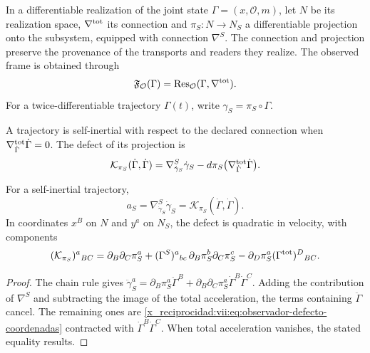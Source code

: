 In a differentiable realization of the joint state
\(\Gamma=(x,\mathcal O,m)\), let \(N\) be its realization space,
\(\nabla^{\rm tot}\) its connection and \(\pi_S:N\to N_S\) a
differentiable projection onto the subsystem, equipped with connection
\(\nabla^S\). The connection and projection preserve the provenance
of the transports and readers they realize. The observed frame is
obtained through
\[
 \mathfrak F_{\mathcal O}(\Gamma)
 =\operatorname{Res}_{\mathcal O}(\Gamma,\nabla^{\rm tot}).
\]
For a twice-differentiable trajectory \(\Gamma(t)\),
write \(\gamma_S=\pi_S\circ\Gamma\).

\begin{definition}
\label{x_reciprocidad:vii:def:observador-autoinercia}
A trajectory is self-inertial with respect to the declared connection
when \(\nabla^{\rm tot}_{\dot\Gamma}\dot\Gamma=0\).
The defect of its projection is
\begin{equation}
 \mathcal K_{\pi_S}(\dot\Gamma,\dot\Gamma)
 =\nabla^S_{\dot\gamma_S}\dot\gamma_S
  -d\pi_S\bigl(\nabla^{\rm tot}_{\dot\Gamma}\dot\Gamma\bigr).
 \label{x_reciprocidad:vii:eq:observador-defecto-proyeccion}
\end{equation}
\end{definition}

\begin{proposition}
\label{x_reciprocidad:vii:prop:observador-aceleracion}
For a self-inertial trajectory,
\[
 a_S=\nabla^S_{\dot\gamma_S}\dot\gamma_S
     =\mathcal K_{\pi_S}(\dot\Gamma,\dot\Gamma).
\]
In coordinates \(x^B\) on \(N\) and \(y^a\) on \(N_S\), the
defect is quadratic in velocity, with components
\begin{equation}
 (\mathcal K_{\pi_S})^a{}_{BC}
 =\partial_B\partial_C\pi_S^a
  +(\Gamma^S)^a{}_{bc}\,
        \partial_B\pi_S^b\partial_C\pi_S^c
  -\partial_D\pi_S^a(\Gamma^{\rm tot})^D{}_{BC}.
 \label{x_reciprocidad:vii:eq:observador-defecto-coordenadas}
\end{equation}
\end{proposition}

\begin{proof}
The chain rule gives
\(\ddot\gamma_S^a=\partial_B\pi_S^a\ddot\Gamma^B
 +\partial_B\partial_C\pi_S^a\dot\Gamma^B\dot\Gamma^C\).
Adding the contribution of \(\nabla^S\) and subtracting the image of
the total acceleration, the terms containing \(\ddot\Gamma\)
cancel. The remaining ones are
\eqref{x_reciprocidad:vii:eq:observador-defecto-coordenadas} contracted with
\(\dot\Gamma^B\dot\Gamma^C\). When total acceleration vanishes,
the stated equality results.
\end{proof}

